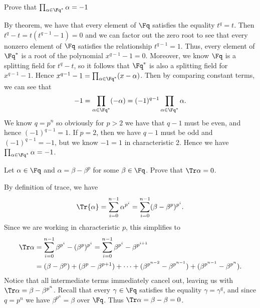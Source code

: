 \documentclass{article}
\begin{document}
\begin{exercise} %
  Prove that \( \prod_{\alpha\in \Fq^*} \alpha = -1 \)
\end{exercise}
\begin{solution}
By theorem, we have that every element of \( \Fq \) satisfies the equality \( t^q = t \).
Then \( t^q-t = t(t^{q-1}-1) = 0 \) and we can factor out the zero root to see that every nonzero element of \( \Fq \) satisfies the relationship \( t^{q-1} = 1 \).
Thus, every element of \( \Fq^* \) is a root of the polynomial \( x^{q-1}-1 = 0 \).
Moreover, we know \( \Fq \) is a splitting field for \( t^q-t \), so it follows that \( \Fq^* \) is also a splitting field for \( x^{q-1}-1 \).
Hence \( x^{q-1}-1 = \prod_{\alpha\in \Fq^*} (x-\alpha) \).
Then by comparing constant terms, we can see that \begin{align*}
  -1 = \prod_{\alpha\in \Fq^*} (-\alpha) = (-1)^{q-1}\prod_{\alpha\in \Fq^*} \alpha.
\end{align*}
We know \( q = p^n \) so obviously for \( p > 2 \) we have that \( q-1 \) must be even, and hence \( (-1)^{q-1}=1 \).
If \( p = 2 \), then we have \( q-1 \) must be odd and \( (-1)^{q-1} = -1 \), but we know \( -1 = 1 \) in characteristic 2.
Hence we have \( \prod_{\alpha\in \Fq^*} \alpha = -1 \).
\end{solution}

\begin{subexercise} %
  Let \( \alpha\in\Fq \) and \( \alpha=\beta-\beta^p \) for some \( \beta\in\Fq \).
  Prove that \( \Tr \alpha = 0 \).
\end{subexercise}
\begin{solution}
By definition of trace, we have \begin{align*}
  \Tr{\alpha} = \sum_{i=0}^{n-1} \alpha^{p^i} = \sum_{i=0}^{n-1}(\beta-\beta^p)^{p^i}.
\end{align*}
Since we are working in characteristic \( p \), this simplifies to \begin{align*}
  \Tr \alpha &= \sum_{i=0}^{n-1}\beta^{p^i}-(\beta^p)^{p^i} = \sum_{i=0}^{n-1}\beta^{p^i}-\beta^{p^{i+1}} \\
  &= (\beta-\beta^p) + (\beta^p - \beta^{p+1}) + \cdots + (\beta^{p^{n-2}}-\beta^{p^{n-1}}) + (\beta^{p^{n-1}}-\beta^{p^n}).
\end{align*}
Notice that all intermediate terms immediately cancel out, leaving us with \( \Tr \alpha = \beta - \beta^{p^n} \).
Recall that every \( \gamma\in \Fq \) satisfies the equality \( \gamma=\gamma^q \), and since \( q=p^n \) we have \( \beta^{p^n} = \beta \) over \( \Fq \).
Thus \( \Tr \alpha = \beta-\beta = 0 \).
\end{solution}
\end{document}
